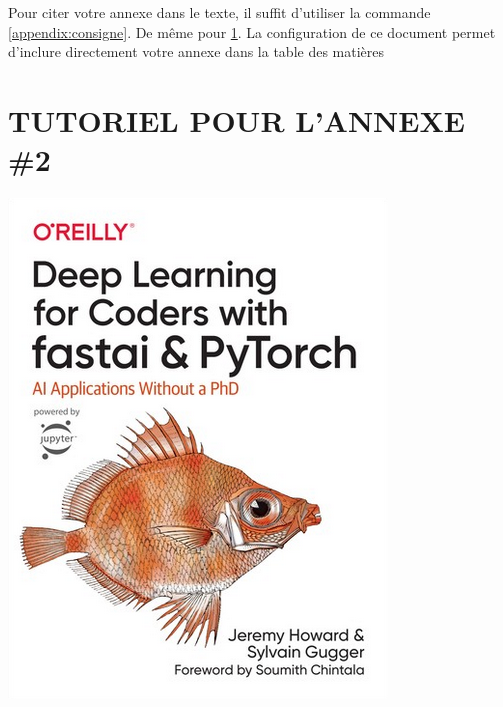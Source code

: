 \documentclass[12pt]{article}
\makeatletter
\newif\ifnotes
\newcommand{\note}[1]{\@bsphack\ifnotes{#1}\fi\@esphack}
\makeatother
\begin{document}
	Pour citer votre annexe dans le texte, il suffit d'utiliser la commande \ref{appendix:consigne}.
	De même pour \ref{appendix:fastbook}. La configuration de ce document permet d'inclure
	directement votre annexe dans la table des matières

	\section{TUTORIEL POUR L'ANNEXE \#2}
	\label{appendix:fastbook}
	\begin{center}
		\includegraphics[scale=1.3]{../img/fastbook.png}
	\end{center}

	\newpage
	
	
	\note{ \newpage

	 }
\end{document}
